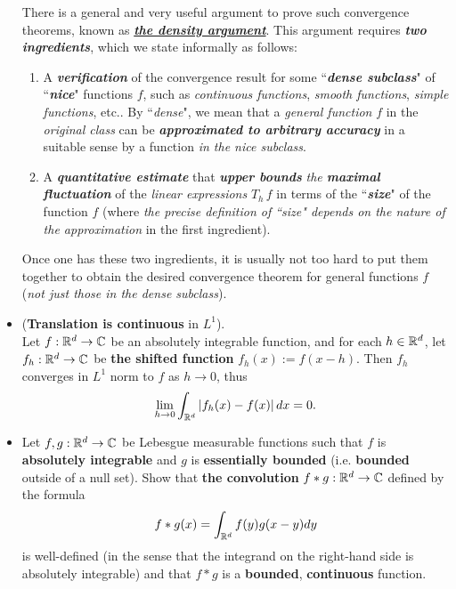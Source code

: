\documentclass[11pt]{article}
\begin{document}
\begin{itemize}
\begin{remark}
There is a general and very useful argument to prove such convergence theorems, known as \underline{\emph{\textbf{the density argument}}}. This argument requires
\emph{\textbf{two ingredients}}, which we state informally as follows:
\begin{enumerate}
\item A \emph{\textbf{verification}} of the convergence result for some ``\emph{\textbf{dense subclass}}" of ``\emph{\textbf{nice}}" functions $f$, such as \emph{continuous functions}, \emph{smooth functions}, \emph{simple functions}, etc.. By ``\emph{dense}", we mean that a \emph{general function} $f$ in the \emph{original class} can be \emph{\textbf{approximated to arbitrary accuracy}} in a suitable sense by a function \emph{in the nice subclass}.
\item A \emph{\textbf{quantitative estimate}} that \emph{\textbf{upper bounds}} \emph{the \textbf{maximal fluctuation}} of the \emph{linear expressions} $T_h\,f$ in terms of the ``\emph{\textbf{size}}" of the function $f$ (where \emph{the precise definition of ``size" depends on the nature of the approximation} in the first ingredient).
\end{enumerate} 
Once one has these two ingredients, it is usually not too hard to put them together to obtain the desired convergence theorem for general functions $f$ (\emph{not just those in the dense subclass}). 
\end{remark}

\item \begin{proposition} (\textbf{Translation is continuous} in $L^1$). \citep{tao2011introduction} \\
Let $f : {\mathbb R}^d \rightarrow {\mathbb C}$ be an absolutely integrable function, and for each $h \in {\mathbb R}^d$, let $f_h : {\mathbb R}^d \rightarrow {\mathbb C}$ be \textbf{the shifted function} $f_h(x) := f(x - h)$.
Then $f_h$ converges in $L^1$ norm to $f$ as $h \rightarrow 0$, thus
\begin{align*}
\lim\limits_{h \rightarrow 0} \int_{{\mathbb R}^d} \left\lvert f_h(x) - f(x) \right\rvert dx = 0.
\end{align*}
\end{proposition}

\item \begin{exercise}
Let $f, g: {\mathbb R}^d \rightarrow {\mathbb C}$ be Lebesgue measurable functions such that $f$ is \textbf{absolutely integrable} and $g$ is \textbf{essentially bounded} (i.e. \textbf{bounded} outside of a null set). Show that \textbf{the convolution} $f * g : {\mathbb R}^d \rightarrow {\mathbb C}$ defined by the formula
\begin{align*}
f * g(x) = \int_{{\mathbb R}^d} f(y)g(x - y) dy
\end{align*} is well-defined (in the sense that the integrand on the right-hand side is absolutely integrable) and that $f * g$ is a \textbf{bounded}, \textbf{continuous} function.
\end{exercise}


\end{itemize}
\end{document}
